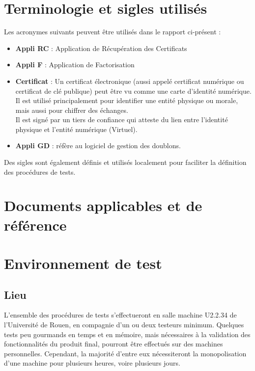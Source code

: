 \documentclass[a4paper,11pt,french]{article}
\begin{document}
\section{Terminologie et sigles utilisés}
Les acronymes suivants peuvent être utilisés dans le rapport ci-présent :


\begin{itemize}
	\item \textbf{Appli RC} : Application de Récupération des Certificats
	\item \textbf{Appli F} : Application de Factorisation
	\item \textbf{Certificat} : Un certificat électronique (aussi appelé certificat numérique ou certificat de clé publique) peut être vu comme une carte d'identité numérique. Il est utilisé principalement pour identifier une entité physique ou morale, mais aussi pour chiffrer des échanges. \\Il est signé par un tiers de confiance qui atteste du lien entre l'identité physique et l'entité numérique (Virtuel).
	\item \textbf{Appli GD} : réfère au logiciel de gestion des doublons.

\end{itemize}


Des sigles sont également définis et utilisés localement pour faciliter la définition des procédures de tests.

\section{Documents applicables et de référence}

\section{Environnement de test}

\subsection{Lieu}

L'ensemble des procédures de tests s'effectueront en salle machine U2.2.34 de l'Université de Rouen, en compagnie d'un ou deux testeurs minimum. Quelques tests peu gourmands en temps et en mémoire, mais nécessaires à la validation des fonctionnalités du produit final, pourront être effectués sur des machines personnelles.
Cependant, la majorité d'entre eux nécessiteront la monopolisation d'une machine pour plusieurs heures, voire plusieurs jours.
\end{document}
